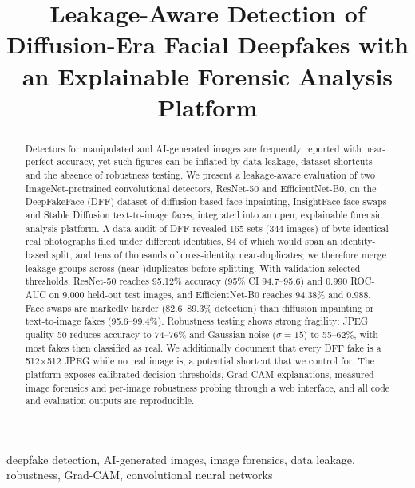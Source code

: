 \documentclass[conference]{IEEEtran}
\begin{document}
\title{Leakage-Aware Detection of Diffusion-Era Facial Deepfakes with an Explainable Forensic Analysis Platform}

\author{
}

\maketitle

\begin{abstract}
Detectors for manipulated and AI-generated images are frequently reported with near-perfect accuracy, yet such figures can be inflated by data leakage, dataset shortcuts and the absence of robustness testing. We present a leakage-aware evaluation of two ImageNet-pretrained convolutional detectors, ResNet-50 and EfficientNet-B0, on the DeepFakeFace (DFF) dataset of diffusion-based face inpainting, InsightFace face swaps and Stable Diffusion text-to-image faces, integrated into an open, explainable forensic analysis platform. A data audit of DFF revealed 165 sets (344 images) of byte-identical real photographs filed under different identities, 84 of which would span an identity-based split, and tens of thousands of cross-identity near-duplicates; we therefore merge leakage groups across (near-)duplicates before splitting. With validation-selected thresholds, ResNet-50 reaches 95.12\% accuracy (95\% CI 94.7--95.6) and 0.990 ROC-AUC on 9{,}000 held-out test images, and EfficientNet-B0 reaches 94.38\% and 0.988. Face swaps are markedly harder (82.6--89.3\% detection) than diffusion inpainting or text-to-image fakes (95.6--99.4\%). Robustness testing shows strong fragility: JPEG quality 50 reduces accuracy to 74--76\% and Gaussian noise ($\sigma{=}15$) to 55--62\%, with most fakes then classified as real. We additionally document that every DFF fake is a 512$\times$512 JPEG while no real image is, a potential shortcut that we control for. The platform exposes calibrated decision thresholds, Grad-CAM explanations, measured image forensics and per-image robustness probing through a web interface, and all code and evaluation outputs are reproducible.
\end{abstract}

\begin{IEEEkeywords}
deepfake detection, AI-generated images, image forensics, data leakage, robustness, Grad-CAM, convolutional neural networks
\end{IEEEkeywords}
\end{document}

